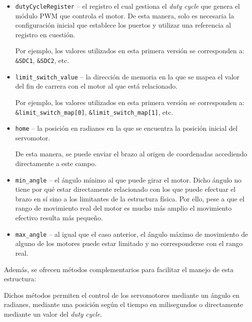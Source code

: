 \begin{itemize}
    \item \texttt{dutyCycleRegister} -- el registro el cual gestiona el \textit{duty cycle} que genera el módulo
    \ac{PWM} que controla el motor. De esta manera, solo es necesaria la configuración
    inicial que establece los puertos y utilizar una referencia al registro en cuestión.
    
    Por ejemplo, los valores utilizados en esta primera versión se corresponden a:
    \lstinline[style=C]{&SDC1}, \lstinline[style=C]{&SDC2}, etc.

    \item \texttt{limit\_switch\_value} -- la dirección de memoria en la que se mapea el valor del fin de carrera
    con el motor al que está relacionado.

    Por ejemplo, los valores utilizados en esta primera versión se corresponden a: \\
    \lstinline[style=C]{&limit_switch_map[0]}, \lstinline[style=C]{&limit_switch_map[1]}, etc.

    \item \texttt{home} -- la posición en radianes en la que se encuentra la posición
    inicial del servomotor.

    De esta manera, se puede enviar el brazo al origen de coordenadas accediendo
    directamente a este campo.

    \item \texttt{min\_angle} -- el ángulo mínimo al que puede girar el motor. Dicho
    ángulo no tiene por qué estar directamente relacionado con los que puede efectuar
    el brazo en sí sino a los limitantes de la estructura física. Por ello, pese a que
    el rango de movimiento real del motor es mucho más amplio el movimiento efectivo
    resulta más pequeño.

    \item \texttt{max\_angle} -- al igual que el caso anterior, el ángulo máximo de
    movimiento de alguno de los motores puede estar limitado y no corresponderse con
    el rango real.
\end{itemize}

Además, se ofrecen métodos complementarios para facilitar el manejo de esta estructura:



Dichos métodos permiten el control de los servomotores mediante un ángulo en radianes,
mediante una posición según el tiempo en milisegundos o directamente mediante un
valor del \textit{duty cycle}.

